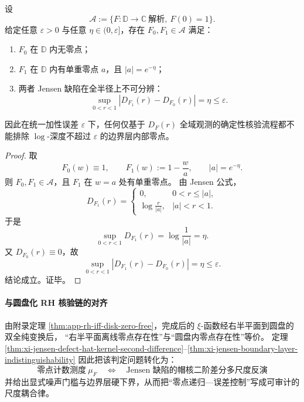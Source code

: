 \begin{theorem}[全域误差下的边界层不可判别性]\label{thm:xi-jensen-boundary-layer-indistinguishability}
设
\[
\mathcal A:=\{F:\mathbb D\to\mathbb C\ \text{解析},\ F(0)=1\}.
\]
给定任意 \(\varepsilon>0\) 与任意 \(\eta\in(0,\varepsilon]\)，存在 \(F_0,F_1\in\mathcal A\) 满足：
\begin{enumerate}
  \item \(F_0\) 在 \(\mathbb D\) 内无零点；
  \item \(F_1\) 在 \(\mathbb D\) 内有单重零点 \(a\)，且 \(|a|=e^{-\eta}\)；
  \item 两者 Jensen 缺陷在全半径上不可分辨：
  \[
  \sup_{0<r<1}|D_{F_1}(r)-D_{F_0}(r)|=\eta\le\varepsilon.
  \]
\end{enumerate}
因此在统一加性误差 \(\varepsilon\) 下，任何仅基于 \(D_F(r)\) 全域观测的确定性核验流程都不能排除 \(\log\)-深度不超过 \(\varepsilon\) 的边界层内部零点。
\end{theorem}
\begin{proof}
取
\[
F_0(w)\equiv 1,\qquad
F_1(w):=1-\frac{w}{a},
\qquad |a|=e^{-\eta}.
\]
则 \(F_0,F_1\in\mathcal A\)，且 \(F_1\) 在 \(w=a\) 处有单重零点。
由 Jensen 公式，
\[
D_{F_1}(r)=
\begin{cases}
0, & 0<r\le |a|,\\[1mm]
\log\!\frac{r}{|a|}, & |a|<r<1.
\end{cases}
\]
于是
\[
\sup_{0<r<1}D_{F_1}(r)=\log\frac{1}{|a|}=\eta.
\]
又 \(D_{F_0}(r)\equiv 0\)，故
\[
\sup_{0<r<1}|D_{F_1}(r)-D_{F_0}(r)|=\eta\le\varepsilon.
\]
结论成立。证毕。
\end{proof}

\paragraph{与圆盘化 RH 核验链的对齐}
由附录定理 \ref{thm:app-rh-iff-disk-zero-free}，完成后的 \(\xi\)-函数经右半平面到圆盘的双全纯变换后，
“右半平面离线零点存在性”与“圆盘内零点存在性”等价。
定理 \ref{thm:xi-jensen-defect-hat-kernel-second-difference}--\ref{thm:xi-jensen-boundary-layer-indistinguishability}
因此把该判定问题转化为：
\[
\text{零点计数测度}\ \mu_F
\quad\Longleftrightarrow\quad
\text{Jensen 缺陷的帽核二阶差分多尺度反演}
\]
并给出显式噪声门槛与边界层硬下界，从而把“零点递归—误差控制”写成可审计的尺度耦合律。

\endinput
